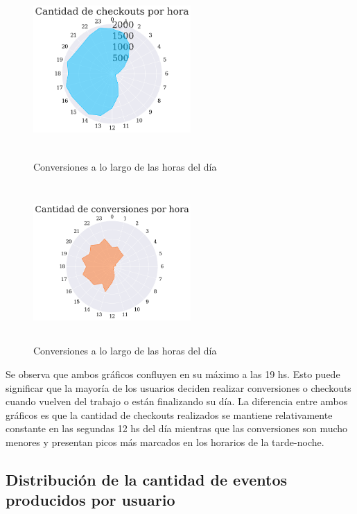 \documentclass[a4paper]{article}
\begin{document}
\begin{figure}[h!]
	\centering
	\begin{minipage}[b]{0.4\textwidth}
		\includegraphics[width=6cm,height=6cm,keepaspectratio]{figures/041-hours-checkout-radarchart.png}
		\caption{Conversiones a lo largo de las horas del día}
	\end{minipage}
	\hfill
	\begin{minipage}[b]{0.4\textwidth}
		\includegraphics[width=6cm,height=6cm,keepaspectratio]{figures/040-hours-conversion-radarchart.png}
		\caption{Conversiones a lo largo de las horas del día}
	\end{minipage}
\end{figure}

Se observa que ambos gráficos confluyen en su máximo a las 19 hs. Esto puede significar que la mayoría de los usuarios deciden realizar conversiones o checkouts cuando vuelven del trabajo o están finalizando su día. La diferencia entre ambos gráficos es que la cantidad de checkouts realizados se mantiene relativamente constante en las segundas 12 hs del día mientras que las conversiones son mucho menores y presentan picos más marcados en los horarios de la tarde-noche. 

\subsection{Distribución de la cantidad de eventos producidos por usuario}
\end{document}
